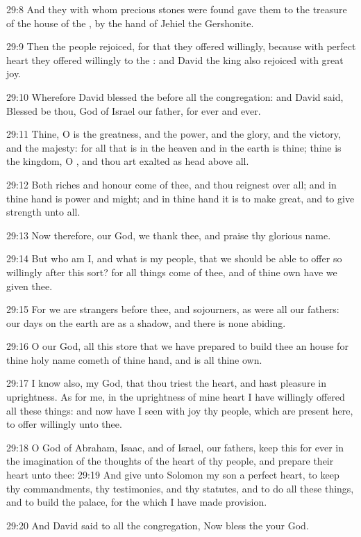 29:8 And they with whom precious stones were found gave them to the
treasure of the house of the \LORD, by the hand of Jehiel the
Gershonite.

29:9 Then the people rejoiced, for that they offered willingly,
because with perfect heart they offered willingly to the \LORD: and
David the king also rejoiced with great joy.

29:10 Wherefore David blessed the \LORD before all the congregation:
and David said, Blessed be thou, \LORD God of Israel our father, for
ever and ever.

29:11 Thine, O \LORD is the greatness, and the power, and the glory,
and the victory, and the majesty: for all that is in the heaven and in
the earth is thine; thine is the kingdom, O \LORD, and thou art exalted
as head above all.

29:12 Both riches and honour come of thee, and thou reignest over all;
and in thine hand is power and might; and in thine hand it is to make
great, and to give strength unto all.

29:13 Now therefore, our God, we thank thee, and praise thy glorious
name.

29:14 But who am I, and what is my people, that we should be able to
offer so willingly after this sort? for all things come of thee, and
of thine own have we given thee.

29:15 For we are strangers before thee, and sojourners, as were all
our fathers: our days on the earth are as a shadow, and there is none
abiding.

29:16 O \LORD our God, all this store that we have prepared to build
thee an house for thine holy name cometh of thine hand, and is all
thine own.

29:17 I know also, my God, that thou triest the heart, and hast
pleasure in uprightness. As for me, in the uprightness of mine heart I
have willingly offered all these things: and now have I seen with joy
thy people, which are present here, to offer willingly unto thee.

29:18 O \LORD God of Abraham, Isaac, and of Israel, our fathers, keep
this for ever in the imagination of the thoughts of the heart of thy
people, and prepare their heart unto thee: 29:19 And give unto Solomon
my son a perfect heart, to keep thy commandments, thy testimonies, and
thy statutes, and to do all these things, and to build the palace, for
the which I have made provision.

29:20 And David said to all the congregation, Now bless the \LORD your
God.

